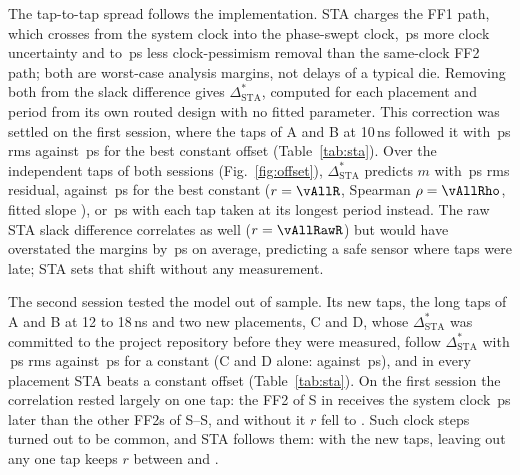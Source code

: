 \documentclass[conference]{IEEEtran}
\newcommand{\Dst}{\Delta^{*}_\mathrm{STA}}
\begin{document}
\begin{table}[t]
\centering
\caption{Per-tap results of the first session (16\,nm, 10\,ns): first failing voltage $V_f$ (V,
SYSMON), measured margin $m$ with its interval (super- and subscript) and predicted offset $\Dst$
(ps); $m'$, $m''$: margin of the same routed design with the 250 and the 125\,ps guard. $m>0$: the
reading reached zero before the first error. Means over \vTapASweeps{} (A), \vTapBSweeps{} (B) and
\vTapGSweeps{} (guards) voltage sweeps.}
\label{tab:taps}
\footnotesize
\setlength{\tabcolsep}{2.2pt}

\end{table}

The tap-to-tap spread follows the implementation. STA charges the FF1 path, which crosses from the
system clock into the phase-swept clock, \vAllDU\,ps more clock uncertainty and \vAllDCPRLo{} to
\vAllDCPRHi\,ps less clock-pessimism removal than the same-clock FF2 path; both are worst-case
analysis margins, not delays of a typical die. Removing both from the slack difference gives $\Dst$,
computed for each placement and period from its own routed design with no fitted parameter. This
correction was settled on the first session, where the \vSessN{} taps of A and B at 10\,ns followed it with
\vSessRms\,ps rms against \vSessNullRms\,ps for the best constant offset (Table~\ref{tab:sta}). Over
the \vAllN{} independent taps of both sessions (Fig.~\ref{fig:offset}), $\Dst$ predicts $m$ with
\vAllRms\,ps rms residual, against \vAllNullRms\,ps for the best constant ($r=\vAllR$, Spearman
$\rho=\vAllRho$, fitted slope \vAllSlope), or \vAllAltLongRms\,ps with each tap taken at its longest
period instead. The raw STA slack difference correlates as well ($r=\vAllRawR$) but would have
overstated the margins by \vAllRawBiasAbs\,ps on average, predicting a safe sensor where
\vAllLateBest{} taps were late; STA sets that shift without any measurement.

\begin{table}[t]
\centering
\caption{STA prediction of the margin, per set of independent taps: correlation $r$ and
least-squares slope of $m$ on $\Dst$, rms of $m-\Dst$ (no fitted parameter) and of $m$ about its
mean (the best constant). $^\dagger$\,$\Dst$ committed before the measurement.}
\label{tab:sta}
\footnotesize
\setlength{\tabcolsep}{3.5pt}

\end{table}

The second session tested the model out of sample. Its \vNewN{} new taps, the long taps of A and B
at 12 to 18\,ns and two new placements, C and D, whose $\Dst$ was committed to the project
repository before they were measured, follow $\Dst$ with \vNewRms\,ps rms against \vNewNullRms\,ps
for a constant (C and D alone: \vCDRms{} against \vCDNullRms\,ps), and in every placement STA beats
a constant offset (Table~\ref{tab:sta}). On the first session the correlation rested largely on one
tap: the FF2 of S\vLooStage{} in \vLooImpl{} receives the system clock \vClkOutPs\,ps later than the
other FF2s of S\vTapAStageLo--S\vTapAStageHi, and without it $r$ fell to \vLooR. Such clock steps turned out to be common, and STA
follows them: with the new taps, leaving out any one tap keeps $r$ between \vAllLooRLo{} and
\vAllLooRHi.
\end{document}
